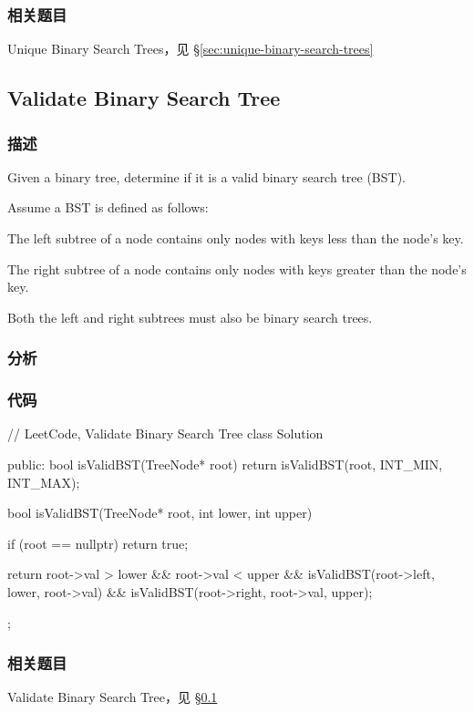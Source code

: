 \subsubsection{相关题目}
\begindot
\item Unique Binary Search Trees，见 \S \ref{sec:unique-binary-search-trees}
\myenddot


\subsection{Validate Binary Search Tree}
\label{sec:validate-binary-search-tree}


\subsubsection{描述}
Given a binary tree, determine if it is a valid binary search tree (BST).

Assume a BST is defined as follows:
\begindot
\item The left subtree of a node contains only nodes with keys less than the node's key.
\item The right subtree of a node contains only nodes with keys greater than the node's key.
\item Both the left and right subtrees must also be binary search trees.
\myenddot


\subsubsection{分析}


\subsubsection{代码}

\begin{Code}
// LeetCode, Validate Binary Search Tree
class Solution {
public:
    bool isValidBST(TreeNode* root) {
        return isValidBST(root, INT_MIN, INT_MAX);
    }

    bool isValidBST(TreeNode* root, int lower, int upper) {
        if (root == nullptr) return true;

        return root->val > lower && root->val < upper
                && isValidBST(root->left, lower, root->val)
                && isValidBST(root->right, root->val, upper);
    }
};
\end{Code}


\subsubsection{相关题目}
\begindot
\item Validate Binary Search Tree，见 \S \ref{sec:validate-binary-search-tree}
\myenddot



